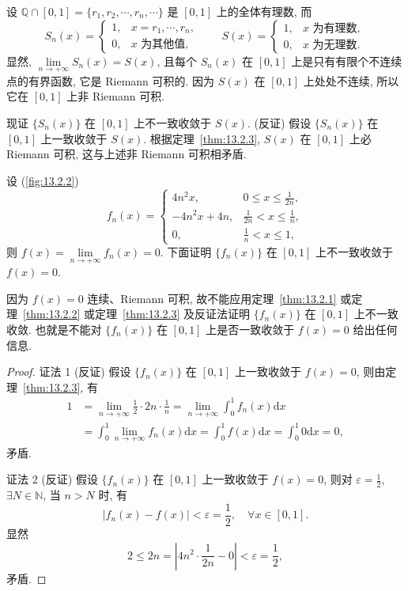 \begin{example}\label{ex:13.2.2}
设 $\mathbb{Q}\cap[0,1]=\{r_{1},r_{2},\cdots,r_{n},\cdots\}$ 是 $[0,1]$ 上的全体有理数, 而
\[
  S_{n}(x)=\begin{cases}1, & x=r_{1},\cdots,r_{n},\\ 0, & x\text{ 为其他值},\end{cases}\qquad
  S(x)=\begin{cases}1, & x\text{ 为有理数},\\ 0, & x\text{ 为无理数}.\end{cases}
\]
显然, $\lim\limits_{n\to+\infty}S_{n}(x)=S(x)$, 且每个 $S_{n}(x)$ 在 $[0,1]$ 上是只有有限个不连续点的有界函数, 它是 Riemann 可积的. 因为 $S(x)$ 在 $[0,1]$ 上处处不连续, 所以它在 $[0,1]$ 上非 Riemann 可积.
\end{example}

现证 $\{S_{n}(x)\}$ 在 $[0,1]$ 上不一致收敛于 $S(x)$. (反证) 假设 $\{S_{n}(x)\}$ 在 $[0,1]$ 上一致收敛于 $S(x)$. 根据定理~\ref{thm:13.2.3}, $S(x)$ 在 $[0,1]$ 上必 Riemann 可积, 这与上述非 Riemann 可积相矛盾.

\begin{example}[参阅\extref{例 6.3.12}]\label{ex:13.2.3}
设 (\cref{fig:13.2.2})
\[
  f_{n}(x)=\begin{cases}
    4n^{2}x, & 0\leqslant x\leqslant\frac{1}{2n},\\
    -4n^{2}x+4n, & \frac{1}{2n}<x\leqslant\frac{1}{n},\\
    0, & \frac{1}{n}<x\leqslant1,
\end{cases}
\]
则 $f(x)=\lim\limits_{n\to+\infty}f_{n}(x)=0$. 下面证明 $\{f_{n}(x)\}$ 在 $[0,1]$ 上不一致收敛于 $f(x)=0$.
\end{example}

因为 $f(x)=0$ 连续、Riemann 可积, 故不能应用定理~\ref{thm:13.2.1} 或定理~\ref{thm:13.2.2} 或定理~\ref{thm:13.2.3} 及反证法证明 $\{f_{n}(x)\}$ 在 $[0,1]$ 上不一致收敛. 也就是不能对 $\{f_{n}(x)\}$ 在 $[0,1]$ 上是否一致收敛于 $f(x)=0$ 给出任何信息.

\begin{proof}
证法 1 (反证) 假设 $\{f_{n}(x)\}$ 在 $[0,1]$ 上一致收敛于 $f(x)=0$, 则由定理~\ref{thm:13.2.3}, 有
\[
  \begin{aligned}
    1&=\lim_{n\to+\infty}\frac{1}{2}\cdot2n\cdot\frac{1}{n}=\lim_{n\to+\infty}\int_{0}^{1}f_{n}(x)\mathrm{d}x\\
    &=\int_{0}^{1}\lim_{n\to+\infty}f_{n}(x)\mathrm{d}x=\int_{0}^{1}f(x)\mathrm{d}x=\int_{0}^{1}0\mathrm{d}x=0,
  \end{aligned}
\]
矛盾.

证法 2 (反证) 假设 $\{f_{n}(x)\}$ 在 $[0,1]$ 上一致收敛于 $f(x)=0$, 则对 $\varepsilon=\frac{1}{2}$, $\exists N\in\mathbb{N}$, 当 $n>N$ 时, 有
\[
  |f_{n}(x)-f(x)|<\varepsilon=\frac{1}{2},\quad\forall x\in[0,1].
\]
显然
\[
  2\leqslant2n=\left|4n^{2}\cdot\frac{1}{2n}-0\right|<\varepsilon=\frac{1}{2},
\]
矛盾.
\end{proof}

